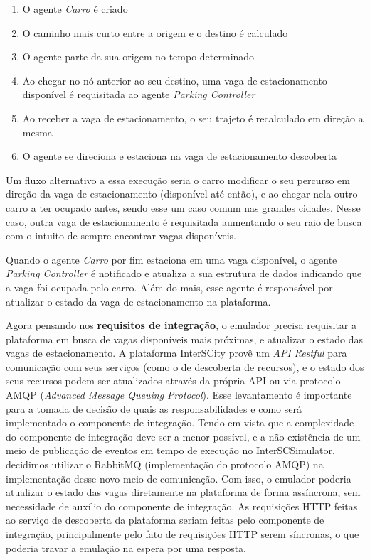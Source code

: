 \begin{enumerate}
    \item O agente \textit{Carro} é criado

    \item O caminho mais curto entre a origem e o destino é calculado

    \item O agente parte da sua origem no tempo determinado

    \item Ao chegar no nó anterior ao seu destino, uma vaga de estacionamento disponível é requisitada ao agente \textit{Parking Controller}

    \item Ao receber a vaga de estacionamento, o seu trajeto é recalculado em direção a mesma

    \item O agente se direciona e estaciona na vaga de estacionamento descoberta 
\end{enumerate}

Um fluxo alternativo a essa execução seria o carro modificar o seu percurso em direção da vaga de estacionamento (disponível até então), e ao chegar nela outro
carro a ter ocupado antes, sendo esse um caso comum nas grandes cidades.
Nesse caso, outra vaga de estacionamento é requisitada aumentando o seu raio de busca com o intuito de sempre encontrar vagas disponíveis.

Quando o agente \textit{Carro} por fim estaciona em uma vaga disponível, o agente \textit{Parking Controller} é notificado e atualiza a sua estrutura de dados indicando
que a vaga foi ocupada pelo carro.
Além do mais, esse agente é responsável por atualizar o estado da vaga de estacionamento na plataforma.

Agora pensando nos \textbf{requisitos de integração}, o emulador precisa requisitar a plataforma em busca de vagas disponíveis mais próximas, e atualizar o estado
das vagas de estacionamento.
A plataforma InterSCity provê um \textit{API Restful} para comunicação com seus serviços (como o de descoberta de recursos), e o estado dos seus recursos podem ser
atualizados através da própria API ou via protocolo AMQP (\textit{Advanced Message Queuing Protocol}).
Esse levantamento é importante para a tomada de decisão de quais as responsabilidades e como será implementado o componente de integração.
Tendo em vista que a complexidade do componente de integração deve ser a menor possível, e a não existência de um meio de publicação de eventos em tempo de execução
no InterSCSimulator, decidimos utilizar o RabbitMQ (implementação do protocolo AMQP) na implementação desse novo meio de comunicação.
Com isso, o emulador poderia atualizar o estado das vagas diretamente na plataforma de forma assíncrona, sem necessidade de auxílio do componente de integração.
As requisições HTTP feitas ao serviço de descoberta da plataforma seriam feitas pelo componente de integração, principalmente pelo fato de requisições HTTP serem
síncronas, o que poderia travar a emulação na espera por uma resposta.

